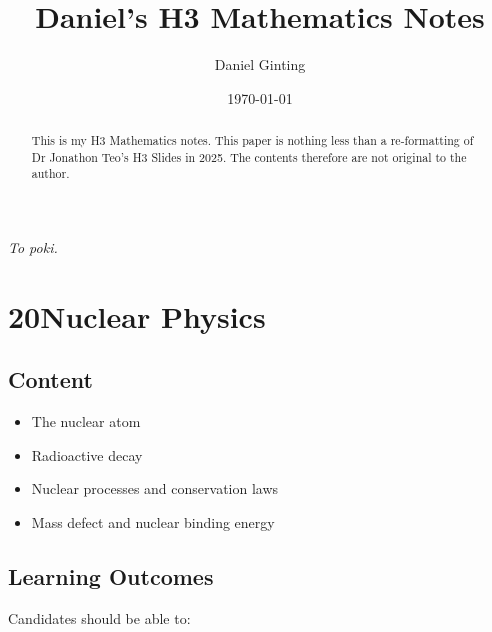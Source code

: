 \documentclass[a4paper]{article}
\title{Daniel's H3 Mathematics Notes}
\author{Daniel Ginting}
\date{\today}
\begin{document}
	
\maketitle

\newpage
\thispagestyle{empty}

\vspace*{\fill}
\begin{center}
	\emph{To poki.}
\end{center}
\vspace*{\fill}

\newpage

\begin{abstract}

This is my H3 Mathematics notes. This paper is nothing less than a re-formatting of Dr Jonathon Teo's H3 Slides in 2025. The contents therefore are not original to the author.

\end{abstract}




\section*{20\quad Nuclear Physics}

\subsection*{Content}

\begin{itemize}
    \item The nuclear atom
    \item Radioactive decay
    \item Nuclear processes and conservation laws
    \item Mass defect and nuclear binding energy
\end{itemize}

\subsection*{Learning Outcomes}

Candidates should be able to:
\end{document}
